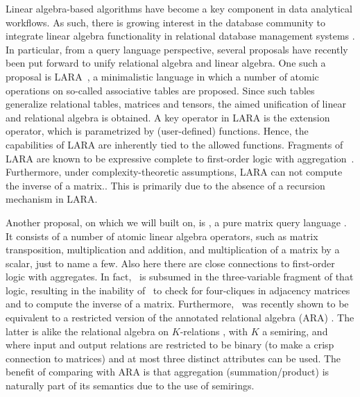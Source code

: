
%
Linear algebra-based algorithms have become a key component in data analytical workflows. As such, there is growing interest in the database community to integrate linear algebra functionality in relational database management systems \cite{}. In particular, from a query language perspective, several proposals have recently been put forward to unify relational algebra and linear algebra. One such a proposal is LARA~\cite{}, a minimalistic language in which a number of atomic operations on so-called associative tables are proposed. Since such tables generalize relational tables, matrices and tensors, the aimed unification of linear and relational algebra is obtained. A key operator in LARA is the extension operator, which is parametrized by (user-defined) functions. Hence, the capabilities of LARA are inherently tied to the allowed functions. Fragments of LARA are known to be expressive complete to first-order logic with aggregation~\cite{}. Furthermore, under complexity-theoretic assumptions, LARA can not compute the inverse of a matrix.\cite{}. This is primarily due to the absence of a recursion mechanism in LARA. 


Another proposal, on which we will built on, is \lang, a pure matrix query language \cite{}. It consists of a number of atomic linear algebra operators, such as matrix transposition, multiplication and addition, and multiplication of a matrix by a scalar, just to name a few. Also here there are close connections to first-order logic with aggregates. In fact, \lang\ is subsumed in the three-variable fragment of that logic, resulting in the inability of \lang\ to check for four-cliques in adjacency matrices and to compute the inverse of a matrix. Furthermore, \lang\ was recently shown to be equivalent to a restricted version of the annotated relational algebra (ARA) \cite{}. The latter is alike the relational algebra on $K$-relations \cite{}, with $K$ a semiring, and  where input and output relations are restricted to be binary (to make a crisp connection to matrices) and at most three distinct attributes can be used. The benefit of comparing with ARA is that aggregation (summation/product) is naturally part of its semantics due to the use of semirings.

